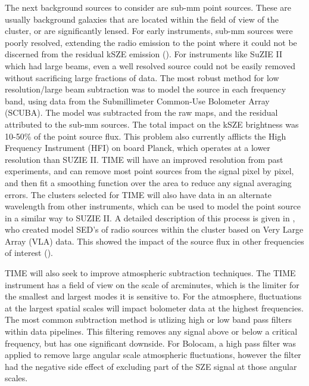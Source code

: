 \documentclass[manuscript]{aastex}
\begin{document}
The next background sources to consider are sub-mm point sources. These are usually background galaxies that are located within the field of view of the cluster, or are significantly lensed. For early instruments, sub-mm sources were poorly resolved, extending the radio emission to the point where it could not be discerned from the residual kSZE emission (\cite{Benson2003}). For instruments like SuZIE II which had large beams, even a well resolved source could not be easily removed without sacrificing large fractions of data. The most robust method for low resolution/large beam subtraction was to model the source in each frequency band, using data from the Submillimeter Common-Use Bolometer Array (SCUBA). The model was subtracted from the raw maps, and the residual attributed to the sub-mm sources. The total impact on the kSZE brightness was 10-50\% of the point source flux. This problem also currently afflicts the High Frequency Instrument (HFI) on board Planck, which operates at a lower resolution than SUZIE II. TIME will have an improved resolution from past experiments, and can remove most point sources from the signal pixel by pixel, and then fit a smoothing function over the area to reduce any signal averaging errors. The clusters selected for TIME will also have data in an alternate wavelength from other instruments, which can be used to model the point source in a similar way to SUZIE II. A detailed description of this process is given in \cite{Adam2016}, who created model SED's of radio sources within the cluster based on Very Large Array (VLA) data. This showed the impact of the source flux in other frequencies of interest (\cite{Adam2017}). 

TIME will also seek to improve atmospheric subtraction techniques. The TIME instrument has a field of view on the scale of arcminutes, which is the limiter for the smallest and largest modes it is sensitive to. For the atmosphere, fluctuations at the largest spatial scales will impact bolometer data at the highest frequencies. The most common subtraction method is utlizing high or low band pass filters within data pipelines. This filtering removes any signal above or below a critical frequency, but has one significant downside. For Bolocam, a high pass filter was applied to remove large angular scale atmospheric fluctuations, however the filter had the negative side effect of excluding part of the SZE signal at those angular scales.  
\end{document}
